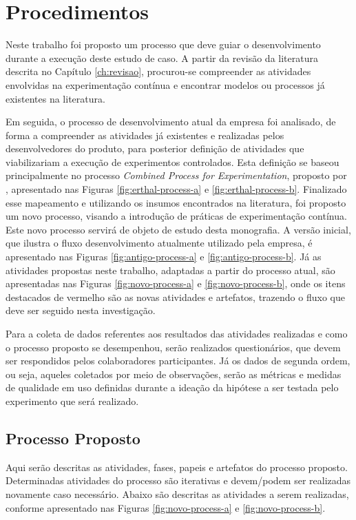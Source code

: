 \section{Procedimentos}
\label{sec:procedimentos}

Neste trabalho foi proposto um processo que deve guiar o desenvolvimento durante a execução deste estudo de caso. A partir da revisão da literatura descrita no Capítulo \ref{ch:revisao}, procurou-se compreender as atividades envolvidas na experimentação contínua e encontrar modelos ou processos já existentes na literatura. 

Em seguida, o processo de desenvolvimento atual da empresa foi analisado, de forma a compreender as atividades já existentes e realizadas pelos desenvolvedores do produto, para posterior definição de atividades que viabilizariam a execução de experimentos controlados. Esta definição se baseou principalmente no processo \textit{Combined Process for Experimentation}, proposto por , apresentado nas Figuras \ref{fig:erthal-process-a} e \ref{fig:erthal-process-b}. Finalizado esse mapeamento e utilizando os insumos encontrados na literatura, foi proposto um novo processo, visando a introdução de práticas de experimentação contínua. Este novo processo servirá de objeto de estudo desta monografia. A versão inicial, que ilustra o fluxo desenvolvimento atualmente utilizado pela empresa, é apresentado nas Figuras \ref{fig:antigo-process-a} e \ref{fig:antigo-process-b}. Já as atividades propostas neste trabalho, adaptadas a partir do processo atual, são apresentadas nas Figuras \ref{fig:novo-process-a} e \ref{fig:novo-process-b}, onde os itens destacados de vermelho são as novas atividades e artefatos, trazendo o fluxo que deve ser seguido nesta investigação.

Para a coleta de dados referentes aos resultados das atividades realizadas e como o processo proposto se desempenhou, serão realizados questionários, que devem ser respondidos pelos colaboradores participantes. Já os dados de segunda ordem, ou seja, aqueles coletados por meio de observações, serão as métricas e medidas de qualidade em uso definidas durante a ideação da hipótese a ser testada pelo experimento que será realizado.

\subsection{Processo Proposto}
\label{subsec:fluxo}

Aqui serão descritas as atividades, fases, papeis e artefatos do processo proposto. Determinadas atividades do processo são iterativas e devem/podem ser realizadas novamente caso necessário. Abaixo são descritas as atividades a serem realizadas, conforme apresentado nas Figuras \ref{fig:novo-process-a} e \ref{fig:novo-process-b}.

